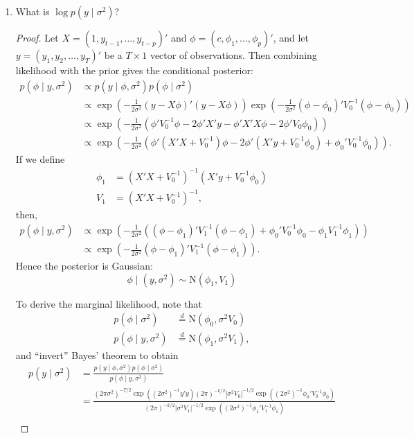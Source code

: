 \documentclass[oneside,reqno]{amsart}
\newcommand{\N}{\mathrm N}
\theoremstyle{definition}
\begin{document}
\begin{enumerate}
\item
What is $\log p(y \mid \sigma^2)$? 

\begin{proof}
Let $X = (1,y_{t-1},\dotsc,y_{t-p})'$ and $\phi = (c, \phi_1,\dotsc,\phi_p)'$, and let $y = (y_1, y_2,\dotsc,y_T)'$ be a $T \times 1$ vector of observations. Then combining likelihood with the prior gives the conditional posterior:
\begin{align*}
	p(\phi \mid y, \sigma^2) &\propto p(y \mid \phi, \sigma^2) p(\phi \mid \sigma^2) \\
	& \propto \exp\left( -\frac{1}{2\sigma^2}(y - X \phi)' (y - X \phi) \right)
	\exp\left(-\frac{1}{2 \sigma^2} (\phi - \phi_0)'  V_0^{-1} (\phi - \phi_0)\right) \\
	&\propto\exp\left(-\frac{1}{2 \sigma^2} ( \phi' V_0^{-1}\phi - 2 \phi' X'y - \phi' X'X \phi - 2 \phi' V_0 \phi_0)\right) \\
	&\propto \exp\left(-\frac{1}{2 \sigma^2} (\phi'(X'X + V_0^{-1}) \phi - 2 \phi'( X'y+ V_0^{-1} \phi_0)+ \phi_0' V_0^{-1} \phi_0 )\right).
\end{align*}
If we define 
\begin{align*}
	\phi_1 &= (X'X + V_0^{-1})^{-1}(X'y +  V_0^{-1} \phi_0) \\
	V_1 &= (X'X + V_0^{-1})^{-1},
\end{align*}
then,
\begin{align*}
	p(\phi \mid y, \sigma^2) &\propto \exp\left(-\frac{1}{2 \sigma^2} \left((\phi - \phi_1)'V_1^{-1}(\phi-\phi_1) + \phi_0'V_0^{-1}\phi_0 - \phi_1V_1^{-1}\phi_1 \right)\right) \\
	&\propto \exp\left(-\frac{1}{2 \sigma^2} (\phi - \phi_1)'V_1^{-1}(\phi-\phi_1)\right).
\end{align*}
Hence the posterior is Gaussian:
\[
	\phi \mid (y, \sigma^2) \sim \N(\phi_1, V_1)
\]
\par
To derive the marginal likelihood, note that
\begin{align*}
	p(\phi\mid \sigma^2)  &\overset{d}{=} \N(\phi_0, \sigma^2  V_0) \\
	p(\phi\mid y, \sigma^2) &\overset{d}{=} \N(\phi_1, \sigma^2  V_1),
\end{align*}
and ``invert'' Bayes' theorem to obtain
\begin{align*}
	 p(y \mid \sigma^2)  & = \frac{p(y \mid \phi, \sigma^2) p(\phi \mid \sigma^2)}{p(\phi \mid y, \sigma^2)}\\
	&= \frac{(2\pi \sigma^2)^{-T/2} \exp((2 \sigma^2)^{-1} y'y) (2\pi)^{-k/2}  |\sigma^2  V_0 |^{-1/2}  \exp((2 \sigma^2)^{-1}  \phi_0'   V_0^{-1} \phi_0)}{ (2\pi)^{-k/2} |\sigma^2  V_1 |^{-1/2} \exp((2 \sigma^2)^{-1} \phi_1'   V_1^{-1}  \phi_1)} \\

\end{align*}
\end{proof}
\end{enumerate}
\end{document}
